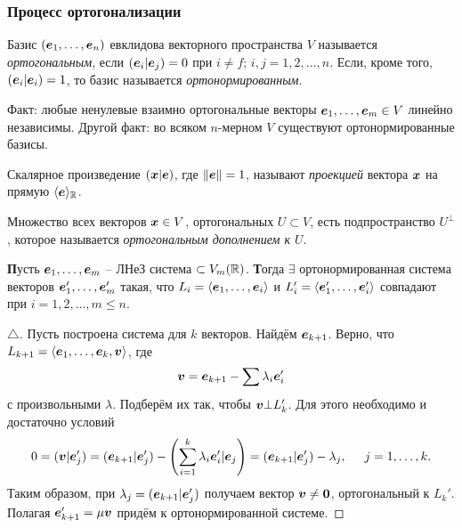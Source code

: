 \subsubsection{Процесс ортогонализации}

\begin{to_def} 
    Базис $(\mbox{\boldmath $e$}_{1}, \ldots, \mbox{\boldmath $e$}_n)$ евклидова векторного пространства $V$ называется \textit{ортогональным}, если $(\mbox{\boldmath $e$}_i | \mbox{\boldmath $e$}_j) = 0$ при $i \neq f$; $i, j = 1, 2, \ldots, n$. Если, кроме того, $(\mbox{\boldmath $e$}_i | \mbox{\boldmath $e$}_i) = 1$, то базис называется \textit{ортонормированным}. 
\end{to_def}

Факт: любые ненулевые взаимно ортогональные векторы $\mbox{\boldmath $e$}_{1}, \ldots, \mbox{\boldmath $e$}_m \in V$ линейно независимы. Другой факт: во всяком $n$-мерном $V$ существуют ортонормированные базисы.

\begin{to_def} 
    Скалярное произведение $(\mbox{\boldmath $x$} | \mbox{\boldmath $e$})$, где $\|\mbox{\boldmath $e$}\| = 1$, называют \textit{проекцией} вектора $\mbox{\boldmath $x$}$ на прямую $\langle \mbox{\boldmath $e$} \rangle_{\mathbb{R}}$.   
\end{to_def}

\begin{to_def} 
    Множество всех векторов $\mbox{\boldmath $x$} \in V$, ортогональных $U \subset V$, есть подпространство $U^{\bot}$, которое называется \textit{ортогональным дополнением к $U$}. 
\end{to_def}

\begin{to_thr}
\textbf{П}усть $\mbox{\boldmath $e$}_1, \dots, \mbox{\boldmath $e$}_m$ --  ЛНеЗ система $\subset V_{m}(\mathbb{R})$. \textbf{Т}огда $\exists$ ортонормированная система векторов $\mbox{\boldmath $e$}_1', \dots, \mbox{\boldmath $e$}_m'$ такая, что $L_i = \langle \mbox{\boldmath $e$}_1, \dots, \mbox{\boldmath $e$}_i \rangle$ и $L_i' = \langle \mbox{\boldmath $e$}_1', \dots, \mbox{\boldmath $e$}_i' \rangle$ совпадают при $i = 1,2, \dots, m \leqslant n$.
\end{to_thr}
  
\begin{proof}[$\triangle$]
    Пусть построена система для $k$ векторов. Найдём $\mbox{\boldmath $e$}_{k+1}$. Верно, что $L_{k+1} = \langle \mbox{\boldmath $e$}_{1}, \ldots, \mbox{\boldmath $e$}_k, \mbox{\boldmath $v$}\rangle$, где
    $$
        \mbox{\boldmath $v$} = \mbox{\boldmath $e$}_{k+1} - \sum \lambda_i \mbox{\boldmath $e$}_i'
    $$
    с произвольными $\lambda$. Подберём их так, чтобы $\mbox{\boldmath $v$} \bot L'_k$. Для этого необходимо и достаточно условий
    $$
        0 = (\mbox{\boldmath $v$} | \mbox{\boldmath $e$}_j') = (\mbox{\boldmath $e$}_{k+1} | \mbox{\boldmath $e$}_j') - \left(\sum_{i=1}^k \lambda_i \mbox{\boldmath $e$}_i' | \mbox{\boldmath $e$}_j \right) = 
        (\mbox{\boldmath $e$}_{k+1} | \mbox{\boldmath $e$}_j') - \lambda_j, \hspace{0.5cm} j = 1, \ldots, k.
    $$
    Таким образом, при $\lambda_j = (\mbox{\boldmath $e$}_{k+1} | \mbox{\boldmath $e$}_j')$ получаем вектор $\mbox{\boldmath $v$} \neq \mbox{\boldmath $0$}$, ортогональный к $L_k'$. Полагая $\mbox{\boldmath $e$}_{k+1}' = \mu \mbox{\boldmath $v$}$ придём к ортонормированной системе. 
\end{proof}

